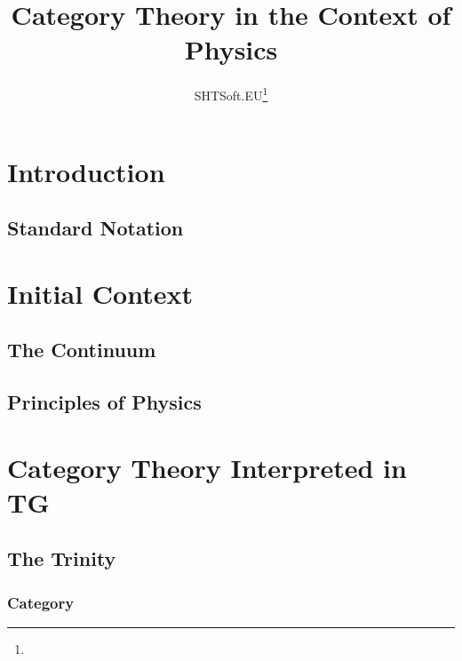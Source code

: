 \documentclass[a4paper,11pt,psamsfonts,reqno]{amsbook}
\newcounter{prpcounter}
\theoremstyle{proposition}
\theoremstyle{proof}
\begin{document}
\title{Category Theory in the Context of Physics}
\author{SHTSoft.EU\footnote{\datename{ \today}}}
\maketitle
\tableofcontents







\chapter{Introduction}
\label{chap:intro}



\section{Standard Notation}
\label{sec:notation}




\chapter{Initial Context}
\label{chap:initcontext}



\section{The Continuum}
\label{sec:continuum}



\section{Principles of Physics}
\label{sec:princphy}




\chapter{Category Theory Interpreted in TG}
\label{chap:cattg}



\section{The Trinity}
\label{sec:trinity}


\subsection{Category}
\label{sec:cat}

\end{document}
